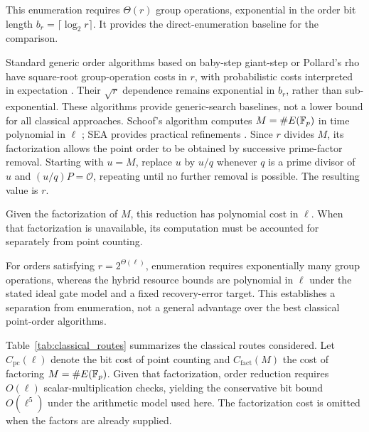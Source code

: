 \begin{revision}
This enumeration requires $\Theta(r)$ group operations, exponential in the order bit length $b_r=\lceil\log_2r\rceil$. It provides the direct-enumeration baseline for the comparison. \end{revision} \begin{revision} Standard generic order algorithms based on baby-step giant-step or Pollard's rho have square-root group-operation costs in $r$, with probabilistic costs interpreted in expectation \cite{Shanks1971,Sutherland2007}. Their $\sqrt{r}$ dependence remains exponential in $b_r$, rather than sub-exponential. These algorithms provide generic-search baselines, not a lower bound for all classical approaches. Schoof's algorithm computes $M=\#E(\mathbb{F}_p)$ in time polynomial in $\ell$ \cite{Schoof1985}; SEA provides practical refinements \cite{Silverman2009,Cohen2006}. Since $r$ divides $M$, its factorization allows the point order to be obtained by successive prime-factor removal. Starting with $u=M$, replace $u$ by $u/q$ whenever $q$ is a prime divisor of $u$ and $(u/q)P=\mathcal O$, repeating until no further removal is possible. The resulting value is $r$.

Given the factorization of $M$, this reduction has polynomial cost in $\ell$. When that factorization is unavailable, its computation must be accounted for separately from point counting.

For orders satisfying $r=2^{\Theta(\ell)}$, enumeration requires exponentially many group operations, whereas the hybrid resource bounds are polynomial in $\ell$ under the stated ideal gate model and a fixed recovery-error target. This establishes a separation from enumeration, not a general advantage over the best classical point-order algorithms.

Table~\ref{tab:classical_routes} summarizes the classical routes considered. Let $C_{\mathrm{pc}}(\ell)$ denote the bit cost of point counting and $C_{\mathrm{fact}}(M)$ the cost of factoring $M=\#E(\mathbb{F}_p)$. Given that factorization, order reduction requires $O(\ell)$ scalar-multiplication checks, yielding the conservative bit bound $O(\ell^5)$ under the arithmetic model used here. The factorization cost is omitted when the factors are already supplied. 
\end{revision}

